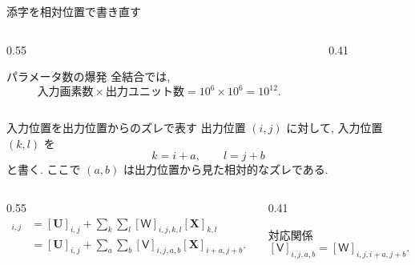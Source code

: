 \documentclass[dvipdfmx,uplatex,unicode,9pt,aspectratio=169]{beamer}
\newcommand{\X}{\mathbf{X}}
\newcommand{\Hid}{\mathbf{H}}
\newcommand{\Wten}{\mathsf{W}}
\newcommand{\Vten}{\mathsf{V}}
\newcommand{\U}{\mathbf{U}}
\begin{document}
\begin{frame}{添字を相対位置で書き直す}
\begin{columns}[T,totalwidth=\textwidth]
\begin{column}{0.55\textwidth}
\begin{block}{パラメータ数の爆発}
全結合では,
\[
  \text{入力画素数}\times \text{出力ユニット数}
  =10^6\times10^6=10^{12}.
\]
\end{block}
\end{column}
\begin{column}{0.41\textwidth}
\centering
{}
\end{column}
\end{columns}
\begin{block}{入力位置を出力位置からのズレで表す}
出力位置 $(i,j)$ に対して, 入力位置 $(k,l)$ を
\[
  k=i+a,\qquad l=j+b
\]
と書く. ここで $(a,b)$ は出力位置から見た相対的なズレである.
\end{block}
\vspace{-0.4em}
\begin{columns}[T,totalwidth=\textwidth]
\begin{column}{0.55\textwidth}
  \centering
\begin{align*}
  [\Hid]_{i,j}
  &= [\U]_{i,j}
  +\sum_k\sum_l [\Wten]_{i,j,k,l}[\X]_{k,l} \\
  &= [\U]_{i,j}
  +\sum_a\sum_b [\Vten]_{i,j,a,b}[\X]_{i+a,j+b}.
\end{align*}
\end{column}
\begin{column}{0.41\textwidth}
\begin{block}{対応関係}
\[
  [\Vten]_{i,j,a,b}
  = [\Wten]_{i,j,i+a,j+b}.
\]
\end{block}
\end{column}
\end{columns}
\end{frame}
\end{document}
